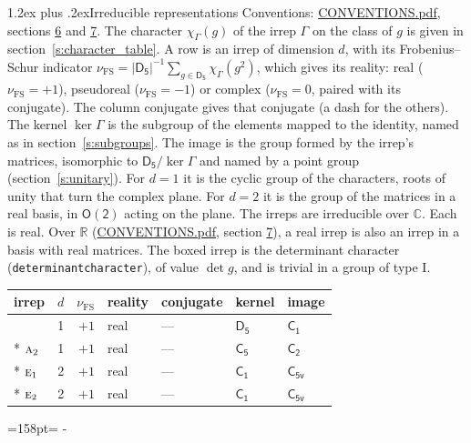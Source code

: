 \documentclass[10pt,a4paper]{article}
\makeatletter
\renewcommand\section{\@startsection{section}{1}{\z@}{-3ex plus -1ex minus -.2ex}%
  {1.2ex plus .2ex}{\normalfont\large\sffamily\bfseries\color{parttitle}}}
\newcommand{\needspace}[1]{\par\penalty-100\begingroup\dimen0=#1\relax\dimen2=\pagegoal
  \advance\dimen2-\pagetotal\ifdim\dimen0>\dimen2\relax\ifdim\dimen2>0pt\vfil\break\fi\fi
  \endgroup}
\numberwithin{equation}{section}
\newcommand{\grp}[1]{\mathsf{#1}}
\newcommand{\irr}[1]{\text{\normalfont\scshape #1}}
\newcommand{\detbox}[1]{{\setlength{\fboxsep}{1pt}\fbox{#1}}}
\newcommand{\irchar}[1]{\chi_{#1}}
\newcommand{\fsind}{\nu_{\mathrm{FS}}}
\makeatother
\begin{document}
\section{Irreducible representations}\label{s:irreps}
Conventions: \href{../../CONVENTIONS.pdf}{CONVENTIONS.pdf}, sections \href{../../CONVENTIONS.pdf\#conv.6}{6} and \href{../../CONVENTIONS.pdf\#conv.7}{7}.
\leavevmode\label{n:function.character}\label{n:irrep.Gamma}The character $\irchar{\Gamma}(g)$ of the irrep $\Gamma$ on the class of $g$ is given in section~\ref{s:character_table}.
\leavevmode\label{n:index.dimension}\label{n:index.frobenius}\label{n:head.irrep}\label{n:head.reality}A row is an irrep of dimension $d$, with its Frobenius--Schur indicator $\fsind = |\grp{D_{5}}|^{-1}\allowbreak\sum_{g\in\grp{D_{5}}}\irchar{\Gamma}(g^2)$, which gives its reality: real ($\fsind = +1$), pseudoreal ($\fsind = -1$) or complex ($\fsind = 0$, paired with its conjugate). \label{n:head.conjugate}The column conjugate gives that conjugate (a dash for the others). \label{n:head.kernel}The kernel $\ker\Gamma$ is the subgroup of the elements mapped to the identity, named as in section~\ref{s:subgroups}. \label{n:head.image}The image is the group formed by the irrep's matrices, isomorphic to $\grp{D_{5}}/\ker\Gamma$ and named by a point group (section~\ref{s:unitary}). For $d = 1$ it is the cyclic group of the characters, roots of unity that turn the complex plane. For $d = 2$ it is the group of the matrices in a real basis, in $\grp{O(2)}$ acting on the plane. The irreps are irreducible over $\mathbb{C}$. Each is real. Over $\mathbb{R}$ (\href{../../CONVENTIONS.pdf}{CONVENTIONS.pdf}, section \href{../../CONVENTIONS.pdf\#conv.7}{7}), a real irrep is also an irrep in a basis with real matrices. \label{n:mark.determinant}The boxed irrep is the determinant character (\texttt{determinantcharacter}), of value $\det g$, and is trivial in a group of type I.
\setlength{\emergencystretch}{2em}\par\setlength{\emergencystretch}{0pt}
{\small\renewcommand{\arraystretch}{1.25}\begin{longtable}{@{}lrrllll@{}}\toprule
irrep & $d$ & $\fsind$ & reality & conjugate & kernel & image\\\midrule\endhead
\bottomrule\endfoot\endlastfoot
\detbox{$\irr{a}_{1}$} & 1 & $+1$ & real & --- & \href{D5.pdf}{$\grp{D_{5}}$} & \href{C1.pdf}{$\grp{C_{1}}$}\\*
$\irr{a}_{2}$ & 1 & $+1$ & real & --- & \href{C5.pdf}{$\grp{C_{5}}$} & \href{C2.pdf}{$\grp{C_{2}}$}\\*
$\irr{e}_{1}$ & 2 & $+1$ & real & --- & \href{C1.pdf}{$\grp{C_{1}}$} & \href{C5v.pdf}{$\grp{C_{5v}}$}\\*
$\irr{e}_{2}$ & 2 & $+1$ & real & --- & \href{C1.pdf}{$\grp{C_{1}}$} & \href{C5v.pdf}{$\grp{C_{5v}}$}\\
\bottomrule\end{longtable}}
\needspace{158pt}
\end{document}
